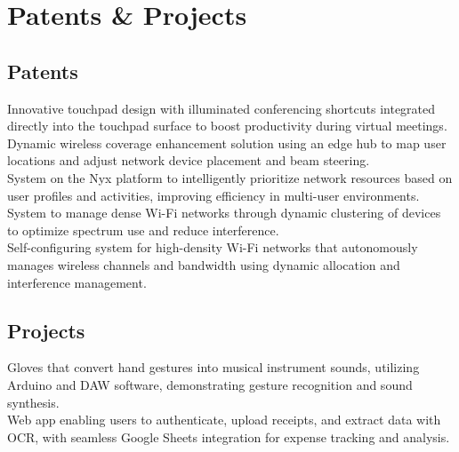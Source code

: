 \documentclass[]{resume-openfont}
\begin{document}
    \begin{minipage}[t]{1\textwidth}
        \section{Patents \& Projects}
        \sectiontitlerule
        
        \begin{patents_and_projects_section}
            \subsection{Patents}
            Innovative touchpad design with illuminated conferencing shortcuts integrated directly into the touchpad surface to boost productivity during virtual meetings.\\
            Dynamic wireless coverage enhancement solution using an edge hub to map user locations and adjust network device placement and beam steering.\\
            System on the Nyx platform to intelligently prioritize network resources based on user profiles and activities, improving efficiency in multi-user environments.\\
            System to manage dense Wi-Fi networks through dynamic clustering of devices to optimize spectrum use and reduce interference.\\
            Self-configuring system for high-density Wi-Fi networks that autonomously manages wireless channels and bandwidth using dynamic allocation and interference management.\\
        \end{patents_and_projects_section}
        
        \begin{patents_and_projects_section}
            \subsection{Projects}
            Gloves that convert hand gestures into musical instrument sounds, utilizing Arduino and DAW software, demonstrating gesture recognition and sound synthesis.\\
            Web app enabling users to authenticate, upload receipts, and extract data with OCR, with seamless Google Sheets integration for expense tracking and analysis.\\
        \end{patents_and_projects_section}
    \end{minipage}
\end{document}
